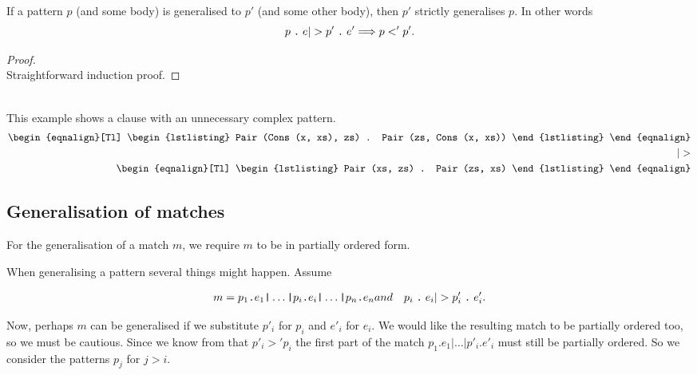 \begin{lemma}\ \\
  \label{lem:single-gen-imp-gen}
  If a pattern $p$ (and some body) is generalised to $p'$ (and some other
  body), then $p'$ strictly generalises $p$. In other words
  \[
  \clause{p}{e} |> \clause{p'}{e'} ==> p <' p'.
  \]
\end{lemma}
\begin{proof}\ \\
  Straightforward induction proof.
\end{proof}

\begin{example}\ \\
  This example shows a clause with an unnecessary complex pattern.
  \begin{eqnarray*}[c]
    \begin{eqnalign}[Tl]
\begin{lstlisting}
Pair (Cons (x, xs), zs) . Pair (zs, Cons (x, xs))
\end{lstlisting}
    \end{eqnalign}\\
    |>\\
    \begin{eqnalign}[Tl]
\begin{lstlisting}
Pair (xs, zs) . Pair (zs, xs)
\end{lstlisting}
    \end{eqnalign}
  \end{eqnarray*}
\end{example}

\subsection{Generalisation of matches}
For the generalisation of a match $m$, we require $m$ to be in partially ordered
form.

When generalising a pattern several things might happen. Assume

\begin{eqnarray*}[rqTcql]
  m = p_1 \texttt{.} e_1 \texttt{|} \ldots \texttt{|} p_i \texttt{.} e_i
  \texttt{|} \ldots \texttt{|} p_n \texttt{.} e_n & and & \clause{p_i}{e_i} |> \clause{p'_i}{e'_i}.
\end{eqnarray*}

Now, perhaps $m$ can be generalised if we substitute $p'_i$ for $p_i$ and $e'_i$
for $e_i$. We would like the resulting match to be partially ordered too, so we
must be cautious. Since we know from  that $p'_i >'
p_i$ the first part of the match $p_1 \texttt{.} e_1 \texttt{|} \ldots
\texttt{|} p'_i \texttt{.} e'_i$ must still be partially ordered. So we consider
the patterns $p_j$ for $j > i$.

